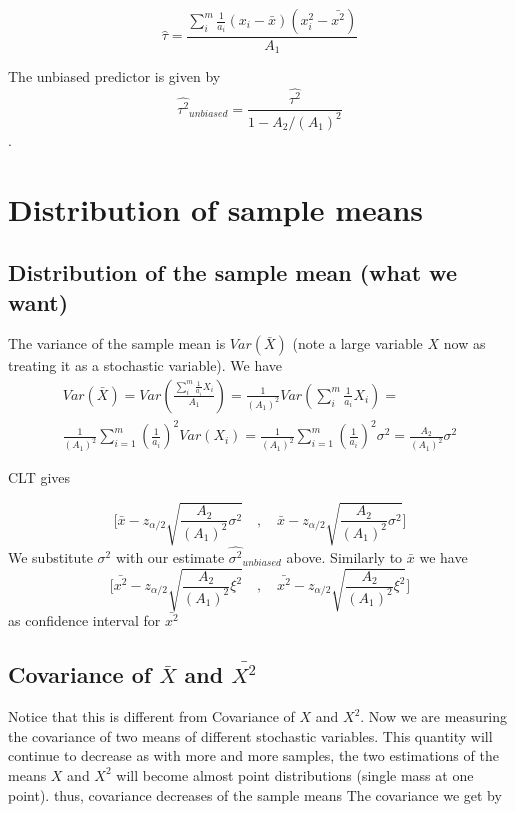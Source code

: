 \documentclass{article}
\begin{document}
\[\hat{\tau} = \frac{\sum_{i}^m \frac{1}{a_i}(x_i-\bar{x})(x^2_i-\bar{x^2})}{A_1} \]

The unbiased predictor is given by
\[\hat{\tau^2}_{unbiased} =  \frac{\hat{\tau^2}}{1- A_2/(A_1)^2 } \].

\section{Distribution of sample means} %
\label{sec:distribution_of_sample_means}


\subsection{Distribution of the \textbf{sample mean} (what we want)}

The variance of the sample mean is $Var(\bar{X})$ (note a large variable $X$ now as treating it as a stochastic variable). We have
\begin{multline}
	Var(\bar{X}) = Var(\frac{\sum_{i}^m \frac{1}{a_i}X_i}{A_1}) = \frac{1}{(A_1)^2} Var(\sum_{i}^m \frac{1}{a_i}X_i) = \\ \frac{1}{(A_1)^2} \sum_{i=1}^m (\frac{1}{a_i})^2 Var(X_i) = \frac{1}{(A_1)^2} \sum_{i=1}^m (\frac{1}{a_i})^2 \sigma^2 = \frac{A_2}{(A_1)^2}  \sigma^2
\end{multline}

CLT gives 

\[ \Big[ \bar{x} -  z_{\alpha/2}\sqrt{\frac{A_2}{(A_1)^2}  \sigma^2} \quad,\quad \bar{x} -  z_{\alpha/2}\sqrt{\frac{A_2}{(A_1)^2}  \sigma^2} \Big]\]
We substitute $\sigma^2$ with our estimate $\hat{\sigma^2}_{unbiased}$ above. Similarly to $\bar{x}$ we have
\[ \Big[ \bar{x^2} -  z_{\alpha/2}\sqrt{\frac{A_2}{(A_1)^2}  \xi^2} \quad,\quad \bar{x^2} -  z_{\alpha/2}\sqrt{\frac{A_2}{(A_1)^2}  \xi^2} \Big]\]
as confidence interval for $ \bar{x^2}$


\subsection{Covariance of $\bar{X}$ and $\bar{X^2}$ }
\label{ssec:another_subtitle}

Notice that this is different from Covariance of $X$ and $X^2$. Now we are measuring the covariance of two means of different stochastic variables. This quantity will continue to decrease as with more and more samples, the two estimations of the means $X$ and $X^2$ will become almost point distributions (single mass at one point). thus, covariance decreases of the sample means
The covariance we get by
\end{document}
